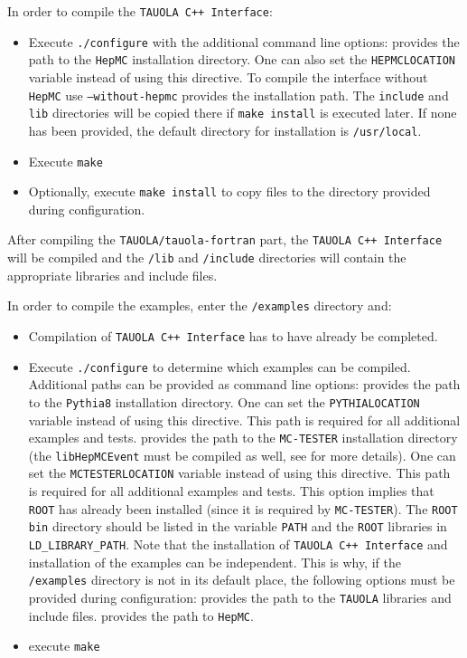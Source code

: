 \documentclass[]{Tauola_interface_design}
\begin{document}
In order to compile the {\tt TAUOLA C++ Interface}:
\begin{itemize}
 \item Execute {\tt ./configure} with the additional command line options:
    provides the path to the {\tt HepMC} installation directory. One can also set the {\tt HEPMCLOCATION} variable instead of using this directive. To compile the interface without {\tt HepMC} use {\tt --without-hepmc}
    provides the installation path. The {\tt include} and {\tt lib} directories will be copied there if {\tt make install} is executed later. If none has been provided, the default directory for installation is {\tt /usr/local}.
 \item Execute {\tt make}
 \item Optionally, execute {\tt make install} to copy files to the directory provided during configuration.
\end{itemize}

After compiling the {\tt TAUOLA/tauola-fortran} part, the {\tt TAUOLA C++ Interface} will be compiled and the {\tt /lib} and {\tt /include} directories will contain the appropriate libraries and include files.

In order to compile the examples, enter the {\tt /examples} directory and:
\begin{itemize}
  \item Compilation of {\tt TAUOLA C++ Interface} has to have already be completed.
  \item Execute {\tt ./configure} to determine which examples can be compiled. Additional paths can be provided as command line options:
    provides the path to the {\tt Pythia8} installation directory. One can set the {\tt PYTHIALOCATION} variable instead of using this directive. This path is required for all additional examples and tests.
    provides the path to the {\tt MC-TESTER} installation directory (the {\tt libHepMCEvent} must be compiled as well, see \cite{Davidson:2008ma} for more details). One can set the {\tt MCTESTERLOCATION} variable instead of using this directive. This path is required for all additional examples and tests.  This option implies that {\tt ROOT} has already been installed (since it is required by {\tt MC-TESTER}). The {\tt ROOT} {\tt bin} directory should be listed in the variable {\tt PATH}
and the {\tt ROOT} libraries in {\tt LD\_LIBRARY\_PATH}.
   \subitem Note that the installation of {\tt TAUOLA C++ Interface} and  installation of the examples
can be independent. This is why, if the {\tt /examples} directory is not in its default place,   the  
following options must be provided during configuration:
    provides the path to the {\tt TAUOLA} libraries and include files.
    provides the path to {\tt HepMC}.
  \item execute {\tt make}
\end{itemize}
\end{document}
